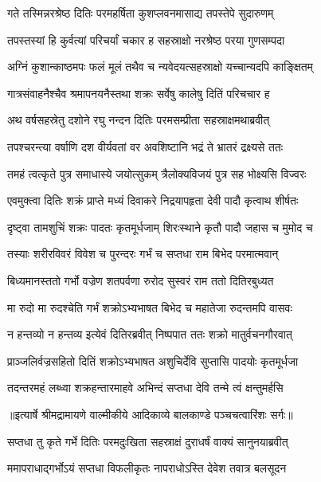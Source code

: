 \twolineshloka
{गते तस्मिन्नरश्रेष्ठ दितिः परमहर्षिता}
{कुशप्लवनमासाद्य तपस्तेपे सुदारुणम्} %

\twolineshloka
{तपस्तस्यां हि कुर्वत्यां परिचर्यां चकार ह}
{सहस्राक्षो नरश्रेष्ठ परया गुणसम्पदा} %

\twolineshloka
{अग्निं कुशान्काष्ठमपः फलं मूलं तथैव च}
{न्यवेदयत्सहस्राक्षो यच्चान्यदपि काङ्क्षितम्} %

\twolineshloka
{गात्रसंवाहनैश्चैव श्रमापनयनैस्तथा}
{शक्रः सर्वेषु कालेषु दितिं परिचचार ह} %

\twolineshloka
{अथ वर्षसहस्रेतु दशोने रघु नन्दन}
{दितिः परमसम्प्रीता सहस्राक्षमथाब्रवीत्} %

\twolineshloka
{तपश्चरन्त्या वर्षाणि दश वीर्यवतां वर}
{अवशिष्टानि भद्रं ते भ्रातरं द्रक्ष्यसे ततः} %

\twolineshloka
{तमहं त्वत्कृते पुत्र समाधास्ये जयोत्सुकम्}
{त्रैलोक्यविजयं पुत्र सह भोक्ष्यसि विज्वरः} %

\twolineshloka
{एवमुक्त्वा दितिः शक्रं प्राप्ते मध्यं दिवाकरे}
{निद्रयापहृता देवी पादौ कृत्वाथ शीर्षतः} %

\twolineshloka
{दृष्ट्वा तामशुचिं शक्रः पादतः कृतमूर्धजाम्}
{शिरःस्थाने कृतौ पादौ जहास च मुमोद च} %

\twolineshloka
{तस्याः शरीरविवरं विवेश च पुरन्दरः}
{गर्भं च सप्तधा राम बिभेद परमात्मवान्} %

\twolineshloka
{बिध्यमानस्ततो गर्भो वज्रेण शतपर्वणा}
{रुरोद सुस्वरं राम ततो दितिरबुध्यत} %

\twolineshloka
{मा रुदो मा रुदश्चेति गर्भं शक्रोऽभ्यभाषत}
{बिभेद च महातेजा रुदन्तमपि वासवः} %

\twolineshloka
{न हन्तव्यो न हन्तव्य इत्येवं दितिरब्रवीत्}
{निष्पपात ततः शक्रो मातुर्वचनगौरवात्} %

\twolineshloka
{प्राञ्जलिर्वज्रसहितो दितिं शक्रोऽभ्यभाषत}
{अशुचिर्देवि सुप्तासि पादयोः कृतमूर्धजा} %

\twolineshloka
{तदन्तरमहं लब्ध्वा शक्रहन्तारमाहवे}
{अभिन्दं सप्तधा देवि तन्मे त्वं क्षन्तुमर्हसि} %


{॥इत्यार्षे श्रीमद्रामायणे वाल्मीकीये आदिकाव्ये बालकाण्डे पञ्चचत्वारिंशः सर्गः॥}


\twolineshloka
{सप्तधा तु कृते गर्भे दितिः परमदुःखिता}
{सहस्राक्षं दुराधर्षं वाक्यं सानुनयाब्रवीत्} %

\twolineshloka
{ममापराधाद्गर्भोऽयं सप्तधा विफलीकृतः}
{नापराधोऽस्ति देवेश तवात्र बलसूदन} %

